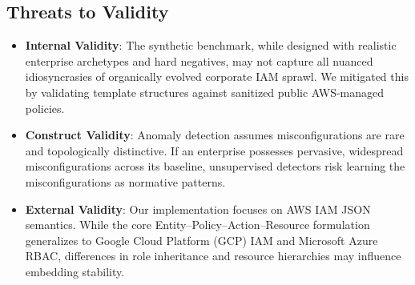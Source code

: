 \subsection{Threats to Validity}
\begin{itemize}
    \item \textbf{Internal Validity}: The synthetic benchmark, while designed with realistic enterprise archetypes and hard negatives, may not capture all nuanced idiosyncrasies of organically evolved corporate IAM sprawl. We mitigated this by validating template structures against sanitized public AWS-managed policies.
    \item \textbf{Construct Validity}: Anomaly detection assumes misconfigurations are rare and topologically distinctive. If an enterprise possesses pervasive, widespread misconfigurations across its baseline, unsupervised detectors risk learning the misconfigurations as normative patterns.
    \item \textbf{External Validity}: Our implementation focuses on AWS IAM JSON semantics. While the core Entity--Policy--Action--Resource formulation generalizes to Google Cloud Platform (GCP) IAM and Microsoft Azure RBAC, differences in role inheritance and resource hierarchies may influence embedding stability.
\end{itemize}


